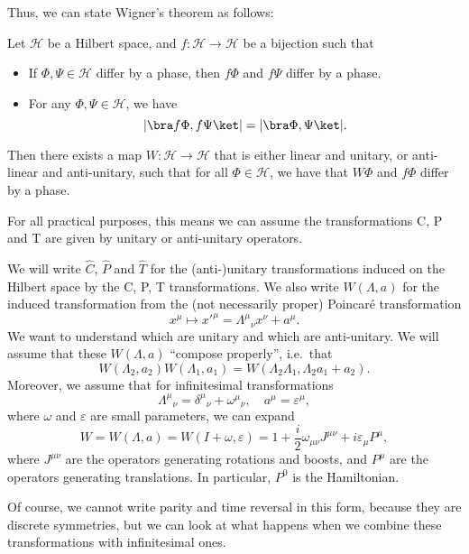 \documentclass[a4paper]{article}
\begin{document}
Thus, we can state Wigner's theorem as follows:
\begin{thm} %
  Let $\mathcal{H}$ be a Hilbert space, and $f: \mathcal{H} \to \mathcal{H}$ be a bijection such that
  \begin{itemize}
    \item If $\Phi, \Psi \in \mathcal{H}$ differ by a phase, then $f\Phi$ and $f\Psi$ differ by a phase.
    \item For any $\Phi, \Psi \in \mathcal{H}$, we have
      \[
        |\bra f\Phi, f\Psi\ket| = |\bra \Phi, \Psi\ket|.
      \]
  \end{itemize}
  Then there exists a map $W: \mathcal{H} \to \mathcal{H}$ that is either linear and unitary, or anti-linear and anti-unitary, such that for all $\Phi \in \mathcal{H}$, we have that $W\Phi$ and $f\Phi$ differ by a phase.
\end{thm}

For all practical purposes, this means we can assume the transformations C, P and T are given by unitary or anti-unitary operators.

We will write $\hat{C}$, $\hat{P}$ and $\hat{T}$ for the (anti-)unitary transformations induced on the Hilbert space by the C, P, T transformations. We also write $W(\Lambda, a)$ for the induced transformation from the (not necessarily proper) Poincar\'e transformation
\[
  x^\mu \mapsto x'^\mu = \Lambda^\mu\!_\nu x^\nu + a^\mu.
\]
We want to understand which are unitary and which are anti-unitary. We will assume that these $W(\Lambda, a)$ ``compose properly'', i.e.\ that
\[
  W(\Lambda_2, a_2)W(\Lambda_1, a_1) = W(\Lambda_2 \Lambda_1, \Lambda_2 a_1 + a_2).
\]
Moreover, we assume that for infinitesimal transformations
\[
  \Lambda^\mu\!_\nu = \delta^\mu\!_\nu + \omega^\mu\!_\nu,\quad a^\mu = \varepsilon^\mu,
\]
where $\omega$ and $\varepsilon$ are small parameters, we can expand
\[
  W = W(\Lambda, a) = W(I + \omega, \varepsilon) = 1 + \frac{i}{2} \omega_{\mu\nu} J^{\mu\nu} + i \varepsilon_\mu P^\mu,
\]
where $J^{\mu\nu}$ are the operators generating rotations and boosts, and $P^\mu$ are the operators generating translations. In particular, $P^0$ is the Hamiltonian.

Of course, we cannot write parity and time reversal in this form, because they are discrete symmetries, but we can look at what happens when we combine these transformations with infinitesimal ones.
\end{document}
